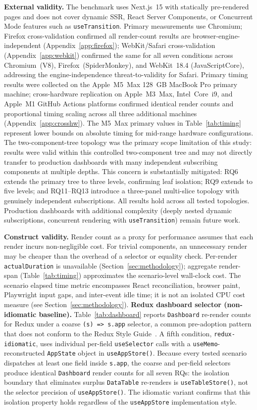 \documentclass[conference]{IEEEtran}
\newcommand{\code}[1]{\texttt{\small #1}}
\begin{document}
\textbf{External validity.} The benchmark uses Next.js~15 with
statically pre-rendered pages and does not cover dynamic SSR, React
Server Components, or Concurrent Mode features such as
\code{useTransition}. Primary measurements use Chromium; Firefox
cross-validation confirmed all render-count results are
browser-engine-independent (Appendix~\ref{app:firefox}); WebKit/Safari
cross-validation (Appendix~\ref{app:webkit}) confirmed the same for
all seven conditions across Chromium~(V8), Firefox~(SpiderMonkey), and
WebKit~18.4 (JavaScriptCore), addressing the engine-independence
threat-to-validity for Safari. Primary timing results were collected on the Apple~M5~Max
128~GB MacBook Pro primary machine; cross-hardware replication on
Apple~M3~Max, Intel~Core~i9, and Apple~M1 GitHub Actions platforms
confirmed identical render counts and proportional timing scaling across
all three additional machines (Appendix~\ref{app:crosshw}).  The M5~Max
primary values in Table~\ref{tab:timing} represent lower bounds on
absolute timing for mid-range hardware configurations.
The two-component-tree topology was the primary scope limitation
of this study: results were valid within this controlled two-component
tree and may not directly transfer to production dashboards with many
independent subscribing components at multiple depths. This concern is
substantially mitigated: RQ6 extends the primary tree to three levels,
confirming leaf isolation; RQ9 extends to five levels; and RQ11--RQ13
introduce a three-panel multi-slice topology with genuinely independent
subscriptions. All results hold across all tested topologies. Production
dashboards with additional complexity (deeply nested dynamic subscriptions,
concurrent rendering with \code{useTransition}) remain future work.

\textbf{Construct validity.} Render count as a proxy for performance
assumes that each render incurs non-negligible cost. For trivial
components, an unnecessary render may be cheaper than the overhead of a
selector or equality check. Per-render \code{actualDuration} is
unavailable (Section~\ref{sec:methodology}); aggregate render-span
(Table~\ref{tab:timing}) approximates the scenario-level wall-clock cost.
The scenario elapsed time metric encompasses React reconciliation,
browser paint, Playwright input gaps, and inter-event idle time; it is
not an isolated CPU cost measure (see Section~\ref{sec:methodology}).
\textbf{Redux dashboard selector (non-idiomatic baseline).}
Table~\ref{tab:dashboard} reports \code{Dashboard} re-render counts
for Redux under a coarse \code{(s) => s.app} selector, a common
pre-adoption pattern that does not conform to the Redux Style
Guide~\cite{b7}. A fifth condition, \code{redux-idiomatic}, uses
individual per-field \code{useSelector} calls with a
\code{useMemo}-reconstructed \code{AppState} object in
\code{useAppStore()}. Because every tested scenario dispatches at
least one field inside \code{s.app}, the coarse and per-field
selectors produce identical \code{Dashboard} render counts for all
seven RQs: the isolation boundary that eliminates surplus
\code{DataTable} re-renders is \code{useTableStore()}, not the
selector precision of \code{useAppStore()}. The idiomatic variant confirms
that this isolation property holds regardless of the
\code{useAppStore} implementation style.
\end{document}
